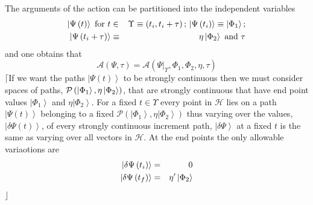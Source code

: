 \documentclass[aps,preprint]{revtex4}
\begin{document}
\begin{description}
\item The arguments of the action can be partitioned into the independent
variables 
\begin{eqnarray}
\left\vert \Psi \left( t\right) \right\rangle \text{ for }t &\in &\Upsilon
\equiv \left( t_{i},t_{i}+\tau \right) ;\,\left\vert \Psi \left(
t_{i}\right) \right\rangle \equiv \left\vert \Phi _{1}\right\rangle ;  \notag
\\
\,\left\vert \Psi \left( t_{i}+\tau \right) \right\rangle &\equiv &\eta
\left\vert \Phi _{2}\right\rangle \text{ and }\tau  \label{part}
\end{eqnarray}%
and one obtains that 
\begin{equation}
\mathcal{A}\left( \Psi ,\tau \right) =\mathcal{A}\left( \left. \Psi
\right\vert _{\Upsilon },\Phi _{1},\Phi _{2},\eta ,\tau \right)
\end{equation}%
$\lceil $If we want the paths $\left\vert \Psi \left( t\right) \right\rangle 
$ to be strongly continuous then we must consider spaces of paths, $\mathcal{%
P}\left( \left\vert \Phi _{1}\right\rangle ,\eta \left\vert \Phi
_{2}\right\rangle \right) $, that are strongly continuous that have end
point values $\left\vert \Phi _{1}\right\rangle $ and $\eta \left\vert \Phi
_{2}\right\rangle $. For a fixed $t\in \Upsilon $ every point in $\mathcal{H}
$ lies on a path $\left\vert \Psi \left( t\right) \right\rangle $ belonging
to a fixed $\mathcal{P}\left( \left\vert \Phi _{1}\right\rangle ,\eta
\left\vert \Phi _{2}\right\rangle \right) $ thus varying over the values, $%
\left\vert \delta \Psi \left( t\right) \right\rangle $, of every strongly
continuous increment path, $\left\vert \delta \Psi \right\rangle $ at a
fixed $t$ is the same as varying over all vectors in $\mathcal{H}$. At the
end points the only allowable variaotions are 
\begin{eqnarray}
\left\vert \delta \Psi \left( t_{i}\right) \right\rangle &=&0  \notag \\
\left\vert \delta \Psi \left( t_{f}\right) \right\rangle &=&\eta ^{\prime
}\left\vert \Phi _{2}\right\rangle
\end{eqnarray}%
$\rfloor $
\end{description}
\end{document}
